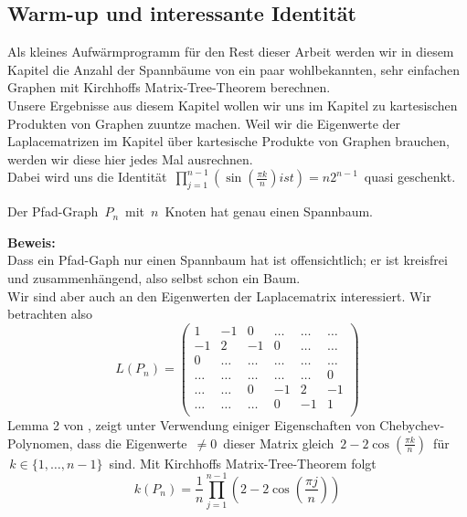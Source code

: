 \subsection{Warm-up und interessante Identität}
Als kleines Aufwärmprogramm für den Rest dieser Arbeit werden wir in diesem Kapitel die Anzahl der Spannbäume von ein paar wohlbekannten, sehr einfachen Graphen mit Kirchhoffs Matrix-Tree-Theorem berechnen.\\
Unsere Ergebnisse aus diesem Kapitel wollen wir uns im Kapitel zu kartesischen Produkten von Graphen zuuntze machen. Weil wir die Eigenwerte der Laplacematrizen im Kapitel über kartesische Produkte von Graphen brauchen, werden wir diese hier jedes Mal ausrechnen.\\
Dabei wird uns die Identität $\, \prod_{j=1}^{n-1} \left(\sin\left(\frac{\pi k}{n}\right) ist \right)=n2^{n-1}\,$ quasi geschenkt.\\
\begin{Lms}
 Der Pfad-Graph $\,P_n\,$ mit $\,n\,$ Knoten hat genau einen Spannbaum.
 \label{PN}
\end{Lms}
\textbf{Beweis:}\\
Dass ein Pfad-Gaph nur einen Spannbaum hat ist offensichtlich; er ist kreisfrei und zusammenhängend, also selbst schon ein Baum.\\
Wir sind aber auch an den Eigenwerten der Laplacematrix interessiert. Wir betrachten also\\
\begin{equation*}
L(P_n)=
\begin{pmatrix}
1&-1&0&\ldots&\ldots&\ldots\\
-1&2&-1&0&\ldots&\ldots\\
0&\ldots&\ldots&\ldots&\ldots&\ldots\\
\ldots&\ldots&\ldots&\ldots&\ldots&0\\
\ldots&\ldots&0&-1&2&-1\\
\ldots&\ldots&\ldots&0&-1&1\\
\end{pmatrix}
\end{equation*}
Lemma 2 von \cite{daoud_2014}, zeigt unter Verwendung einiger Eigenschaften von Chebychev-Polynomen, dass die Eigenwerte $\,\neq 0\,$ dieser Matrix gleich $\,2-2\cos \left(\frac{\pi k}{n}\right)\,$ für $\,k \in \{1,\ldots,n-1\}\,$ sind.
Mit Kirchhoffs Matrix-Tree-Theorem folgt
\begin{equation*}
 \mathit{k}(P_n)=\frac{1}{n}\prod_{j=1}^{n-1} \left(2-2\cos \left(\frac{\pi j}{n}\right)\right)
\end{equation*}
